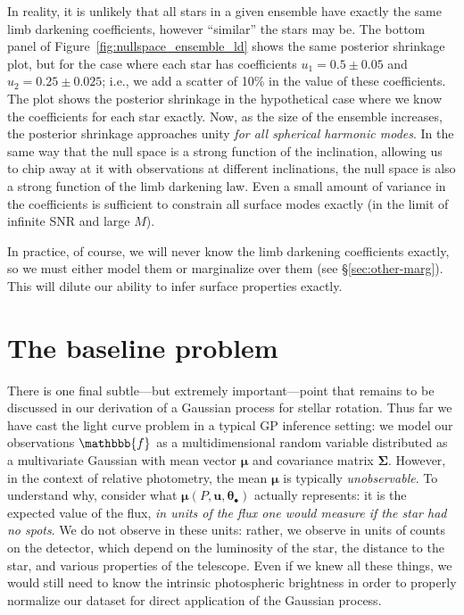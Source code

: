 \documentclass[modern]{aastex62}
\begin{document}
In reality, it is unlikely that all stars in a given ensemble have exactly
the same limb darkening coefficients, however ``similar'' the stars may be.
The bottom panel of Figure~\ref{fig:nullspace_ensemble_ld} shows the same
posterior shrinkage plot, but for the case where each star has coefficients
$u_1 = 0.5 \pm 0.05$ and $u_2 = 0.25 \pm 0.025$; i.e., we add a scatter of
10\% in the value of these coefficients. The plot shows the posterior
shrinkage in the hypothetical case where we know the coefficients for
each star exactly. Now, as the size of the ensemble increases, the posterior
shrinkage approaches unity \emph{for all spherical harmonic modes}.
In the same way that the null space is a strong function of the inclination,
allowing us to chip away at it with observations at different inclinations,
the null space is also a strong function of the limb darkening law. Even a
small amount of variance in the coefficients is sufficient to constrain all surface
modes exactly (in the limit of infinite SNR and large $M$).

In practice, of course, we will never know the limb darkening coefficients
exactly, so we must either model them or marginalize over them
(see \S\ref{sec:other-marg}). This will dilute our ability to infer surface
properties exactly.

\section{The baseline problem}
\label{sec:baseline}

There is one final subtle---but extremely important---point that remains to
be discussed in our derivation of a Gaussian process for stellar
rotation. Thus far we have cast the light curve problem in a typical GP inference
setting: we model our observations $\mathbbb{f}$ as
a multidimensional random variable distributed as a multivariate Gaussian with mean vector
$\pmb{\mu}$ and covariance matrix $\pmb{\Sigma}$. However, in the context of
relative photometry, the mean $\pmb{\mu}$ is typically \emph{unobservable}.
%
To understand why, consider what
$\pmb{\mu}(P, \mathbf{u}, \pmb{\theta}_\bullet)$ actually represents:
it is the expected value
of the flux,
\emph{in units of the flux one would measure if the star had no spots}.
We do not observe in these units: rather, we observe in units of counts on
the detector, which depend on the luminosity of the star, the distance to
the star, and various properties of the telescope. Even if we knew all these
things, we would still need to know the intrinsic photospheric brightness
in order to properly normalize our dataset for direct application of
the Gaussian process.
\end{document}
